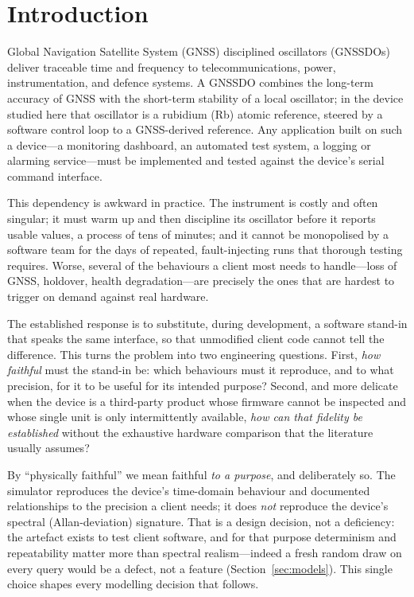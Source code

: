 \documentclass[conference]{IEEEtran}
\begin{document}
\section{Introduction}
Global Navigation Satellite System (GNSS) disciplined oscillators
(GNSSDOs) deliver traceable time and frequency to telecommunications,
power, instrumentation, and defence systems. A GNSSDO combines the
long-term accuracy of GNSS with the short-term stability of a local
oscillator; in the device studied here that oscillator is a rubidium
(Rb) atomic reference, steered by a software control loop to a
GNSS-derived reference. Any application built on such a device---a
monitoring dashboard, an automated test system, a logging or alarming
service---must be implemented and tested against the device's serial
command interface.

This dependency is awkward in practice. The instrument is costly and
often singular; it must warm up and then discipline its oscillator
before it reports usable values, a process of tens of minutes; and it
cannot be monopolised by a software team for the days of repeated,
fault-injecting runs that thorough testing requires. Worse, several of
the behaviours a client most needs to handle---loss of GNSS, holdover,
health degradation---are precisely the ones that are hardest to trigger
on demand against real hardware.

The established response is to substitute, during development, a
software stand-in that speaks the same interface, so that unmodified
client code cannot tell the difference. This turns the problem into two
engineering questions. First, \emph{how faithful} must the stand-in be:
which behaviours must it reproduce, and to what precision, for it to be
useful for its intended purpose? Second, and more delicate when the
device is a third-party product whose firmware cannot be inspected and
whose single unit is only intermittently available, \emph{how can that
fidelity be established} without the exhaustive hardware comparison that
the literature usually assumes?

By ``physically faithful'' we mean faithful \emph{to a purpose}, and
deliberately so. The simulator reproduces the device's time-domain
behaviour and documented relationships to the precision a client needs;
it does \emph{not} reproduce the device's spectral (Allan-deviation)
signature. That is a design decision, not a deficiency: the artefact
exists to test client software, and for that purpose determinism and
repeatability matter more than spectral realism---indeed a fresh random
draw on every query would be a defect, not a feature
(Section~\ref{sec:models}). This single choice shapes every modelling
decision that follows.
\end{document}
